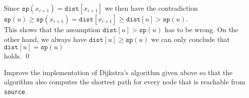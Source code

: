 \begin{enumerate}
      Since $\texttt{sp}(x_{i+1}) = \texttt{dist}[x_{i+1}]$ we then have the contradiction
      \\[0.2cm]
      \hspace*{1.3cm} 
      $\texttt{sp}(u) \geq \texttt{sp}(x_{i+1}) = \texttt{dist}[x_{i+1}] \geq \texttt{dist}[u] > \texttt{sp}(u)$.
      \\[0.2cm]
      This shows that the assumption $\texttt{dist}[u] > \texttt{sp}(u)$ has to be wrong.  On the
      other hand, we always have $\texttt{dist}[u] \geq \texttt{sp}(u)$ we can only conclude that
      \\[0.2cm]
      \hspace*{1.3cm}
      $\texttt{dist}[u] = \texttt{sp}(u)$
      \\[0.2cm]
      holds. \qed
\end{enumerate}

\exercise
Improve the implementation of Dijkstra's algorithm given above so that the algorithm also computes
the shortest path for every node that is reachable from \texttt{source}.
\eox


